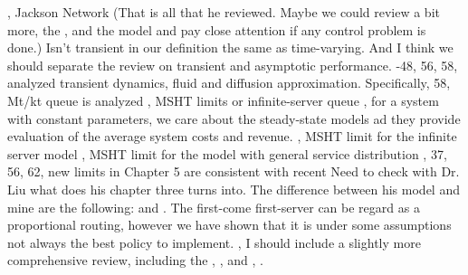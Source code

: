 , Jackson Network (That is all that he reviewed. Maybe we could review a bit more, the ,  and the  model and pay close attention if any control problem is done.)\markdownRendererUlItemEnd 
\markdownRendererUlItem \markdownRendererUlItemEnd 
\markdownRendererUlEndTight \markdownRendererInterblockSeparator
{}\markdownRendererInterblockSeparator
{}Isn't transient in our definition the same as time-varying. And I think we should separate the review on transient and asymptotic performance.\markdownRendererInterblockSeparator
{}\markdownRendererUlBeginTight
{}-48, 56, 58, analyzed transient dynamics, fluid and diffusion approximation.\markdownRendererUlItemEnd 
\markdownRendererUlItem Specifically, 58, \markdownRendererDollarSign{}Mt/kt\markdownRendererDollarSign{} queue is analyzed\markdownRendererUlItemEnd 
{}, MSHT limits or infinite-server queue\markdownRendererUlItemEnd 
{}, for a system with constant parameters, we care about the steady-state models ad they provide evaluation of the average system costs and revenue.\markdownRendererUlItemEnd 
\markdownRendererUlEndTight \markdownRendererInterblockSeparator
{}\markdownRendererHorizontalRule{}\markdownRendererInterblockSeparator
{}\markdownRendererInterblockSeparator
{}\markdownRendererUlBeginTight
{}, MSHT limit for the infinite server model\markdownRendererUlItemEnd 
{}, MSHT limit for the model with general service distribution\markdownRendererUlItemEnd 
{}, 37, 56, 62, new limits in Chapter 5 are consistent with recent\markdownRendererUlItemEnd 
\markdownRendererUlEndTight \markdownRendererInterblockSeparator
{}\markdownRendererHorizontalRule{}\markdownRendererInterblockSeparator
{}\markdownRendererInterblockSeparator
{}\markdownRendererInterblockSeparator
{}\markdownRendererUlBeginTight
\markdownRendererUlItem Need to check with Dr. Liu what does his chapter three turns into. The difference between his model and mine are the following:  and . The first-come first-server can be regard as a proportional routing, however we have shown that it is under some assumptions not always the best policy to implement.\markdownRendererUlItemEnd 
{},\markdownRendererUlItemEnd 
\markdownRendererUlEndTight \markdownRendererInterblockSeparator
{}\markdownRendererInterblockSeparator
{}I should include a slightly more comprehensive review, including the , , and , .\relax